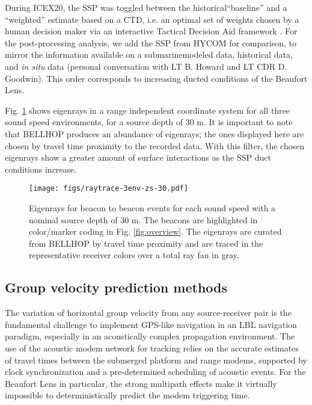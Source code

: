 During ICEX20, the SSP was toggled between the historical``baseline'' and a ``weighted'' estimate based on a CTD, i.e. an optimal set of weights chosen by a human decision maker via an interactive Tactical Decision Aid framework \citep{bhatt_embedded_2021}.
For the post-processing analysis, we add the SSP from HYCOM for comparison, to mirror the information available on a submarine\textemdash modeled data, historical data, and \textit{in situ} data (personal conversation with LT B. Howard and LT CDR D. Goodwin).
This order corresponds to increasing ducted conditions of the Beaufort Lens.

Fig. \ref{fig:raytrace-zs30} shows eigenrays in a range independent coordinate system for all three sound speed environments, for a source depth of 30 m.
It is important to note that BELLHOP produces an abundance of eigenrays; the ones displayed here are chosen by travel time proximity to the recorded data.
With this filter, the chosen eigenrays show a greater amount of surface interactions as the SSP duct conditions increase.

\begin{figure}[h!]
  \centering
  \texttt{[image: figs/raytrace-3env-zs-30.pdf]}
  \caption{Eigenrays for beacon to beacon events for each sound speed with a nominal source depth of 30 m. The beacons are highlighted in color/marker coding in Fig. \ref{fig:overview}. The eigenrays are curated from BELLHOP by travel time proximity and are traced in the representative receiver colors over a total ray fan in gray.}
  \label{fig:raytrace-zs30}
  \end{figure}

\FloatBarrier
\subsection{Group velocity prediction methods}

The variation of horizontal group velocity from any source-receiver pair is the fundamental challenge to implement GPS-like navigation in an LBL navigation paradigm, especially in an acoustically complex propagation environment.
The use of the acoustic modem network for tracking relies on the accurate estimates of travel times between the submerged platform and range modems, supported by clock synchronization and a pre-determined scheduling of acoustic events.
For the Beaufort Lens in particular, the strong multipath effects make it virtually impossible to deterministically predict the modem triggering time.

